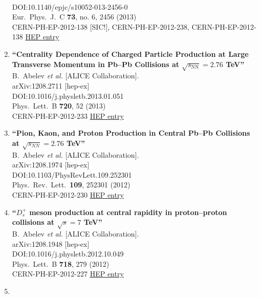 \begin{enumerate}
  \\{}DOI:10.1140/epjc/s10052-013-2456-0
  \\{}Eur.\ Phys.\ J.\ C {\bf 73}, no. 6, 2456 (2013)
  \\{}CERN-PH-EP-2012-138 [SIC!], CERN-PH-EP-2012-238, CERN-PH-EP-2012-138
\href{http://inspirehep.net/record/1181770}{HEP entry}
\item%
{\bf ``Centrality Dependence of Charged Particle Production at Large Transverse Momentum in Pb--Pb Collisions at $\sqrt{s_{\mathrm{NN}}} = 2.76$ TeV''}
  \\{}B.~Abelev {\it et al.} [ALICE Collaboration].
  \\{}arXiv:1208.2711 [hep-ex]
  \\{}DOI:10.1016/j.physletb.2013.01.051
  \\{}Phys.\ Lett.\ B {\bf 720}, 52 (2013)
  \\{}CERN-PH-EP-2012-233
\href{http://inspirehep.net/record/1127497}{HEP entry}
\item%
{\bf ``Pion, Kaon, and Proton Production in Central Pb--Pb Collisions at $\sqrt{s_{NN}} = 2.76$ TeV''}
  \\{}B.~Abelev {\it et al.} [ALICE Collaboration].
  \\{}arXiv:1208.1974 [hep-ex]
  \\{}DOI:10.1103/PhysRevLett.109.252301
  \\{}Phys.\ Rev.\ Lett.\  {\bf 109}, 252301 (2012)
  \\{}CERN-PH-EP-2012-230
\href{http://inspirehep.net/record/1126966}{HEP entry}
\item%
{\bf ``$D_{s}^+$ meson production at central rapidity in proton--proton collisions at $\sqrt{s}=7$ TeV''}
  \\{}B.~Abelev {\it et al.} [ALICE Collaboration].
  \\{}arXiv:1208.1948 [hep-ex]
  \\{}DOI:10.1016/j.physletb.2012.10.049
  \\{}Phys.\ Lett.\ B {\bf 718}, 279 (2012)
  \\{}CERN-PH-EP-2012-227
\href{http://inspirehep.net/record/1126963}{HEP entry}
\item%

\end{enumerate}
